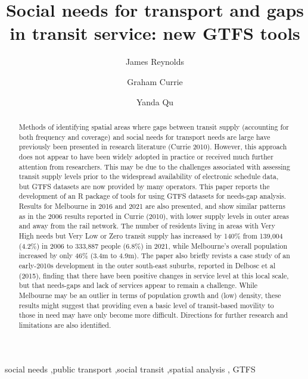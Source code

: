 \documentclass[preprint, 3p,
authoryear]{elsarticle} %
\begin{document}
\begin{frontmatter}

  \title{Social needs for transport and gaps in transit service: new
GTFS tools}
    \author[Public Transport Research Group (PTRG)]{James Reynolds%
  }
    \author[Public Transport Research Group (PTRG)]{Graham Currie%
  }
    \author[Public Transport Research Group (PTRG)]{Yanda Qu%
  }
  
  \begin{abstract}
  Methods of identifying spatial areas where gaps between transit supply
  (accounting for both frequency and coverage) and social needs for
  transport needs are large have previously been presented in research
  literature (Currie 2010). However, this approach does not appear to
  have been widely adopted in practice or received much further
  attention from researchers. This may be due to the challenges
  associated with assessing transit supply levels prior to the
  widespread availability of electronic schedule data, but GTFS datasets
  are now provided by many operators. This paper reports the development
  of an R package of tools for using GTFS datasets for needs-gap
  analysis. Results for Melbourne in 2016 and 2021 are also presented,
  and show similar patterns as in the 2006 results reported in Currie
  (2010), with lower supply levels in outer areas and away from the rail
  network. The number of residents living in areas with Very High needs
  but Very Low or Zero transit supply has increased by 140\% from
  139,004 (4.2\%) in 2006 to 333,887 people (6.8\%) in 2021, while
  Melbourne's overall population increased by only 46\% (3.4m to 4.9m).
  The paper also briefly revists a case study of an early-2010s
  development in the outer south-east suburbs, reported in Delbosc et al
  (2015), finding that there have been positive changes in service level
  at this local scale, but that needs-gaps and lack of services appear
  to remain a challenge. While Melbourne may be an outlier in terms of
  population growth and (low) density, these results might suggest that
  providing even a basic level of transit-based movility to those in
  need may have only become more difficult. Directions for further
  research and limitations are also identified.
  \end{abstract}
    \begin{keyword}
    social needs \sep public transport \sep social transit \sep spatial
analysis \sep 
    GTFS
  \end{keyword}
  
 \end{frontmatter}
\end{document}
